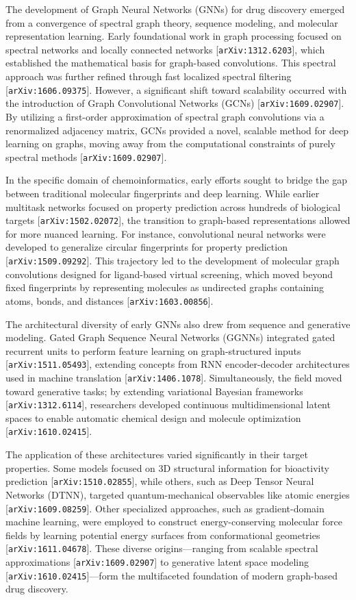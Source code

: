 \documentclass[11pt]{article}
\begin{document}
The development of Graph Neural Networks (GNNs) for drug discovery emerged from a convergence of spectral graph theory, sequence modeling, and molecular representation learning. Early foundational work in graph processing focused on spectral networks and locally connected networks [\texttt{arXiv:1312.6203}], which established the mathematical basis for graph-based convolutions. This spectral approach was further refined through fast localized spectral filtering [\texttt{arXiv:1606.09375}]. However, a significant shift toward scalability occurred with the introduction of Graph Convolutional Networks (GCNs) [\texttt{arXiv:1609.02907}]. By utilizing a first-order approximation of spectral graph convolutions via a renormalized adjacency matrix, GCNs provided a novel, scalable method for deep learning on graphs, moving away from the computational constraints of purely spectral methods [\texttt{arXiv:1609.02907}].

In the specific domain of chemoinformatics, early efforts sought to bridge the gap between traditional molecular fingerprints and deep learning. While earlier multitask networks focused on property prediction across hundreds of biological targets [\texttt{arXiv:1502.02072}], the transition to graph-based representations allowed for more nuanced learning. For instance, convolutional neural networks were developed to generalize circular fingerprints for property prediction [\texttt{arXiv:1509.09292}]. This trajectory led to the development of molecular graph convolutions designed for ligand-based virtual screening, which moved beyond fixed fingerprints by representing molecules as undirected graphs containing atoms, bonds, and distances [\texttt{arXiv:1603.00856}].

The architectural diversity of early GNNs also drew from sequence and generative modeling. Gated Graph Sequence Neural Networks (GGNNs) integrated gated recurrent units to perform feature learning on graph-structured inputs [\texttt{arXiv:1511.05493}], extending concepts from RNN encoder-decoder architectures used in machine translation [\texttt{arXiv:1406.1078}]. Simultaneously, the field moved toward generative tasks; by extending variational Bayesian frameworks [\texttt{arXiv:1312.6114}], researchers developed continuous multidimensional latent spaces to enable automatic chemical design and molecule optimization [\texttt{arXiv:1610.02415}].

The application of these architectures varied significantly in their target properties. Some models focused on 3D structural information for bioactivity prediction [\texttt{arXiv:1510.02855}], while others, such as Deep Tensor Neural Networks (DTNN), targeted quantum-mechanical observables like atomic energies [\texttt{arXiv:1609.08259}]. Other specialized approaches, such as gradient-domain machine learning, were employed to construct energy-conserving molecular force fields by learning potential energy surfaces from conformational geometries [\texttt{arXiv:1611.04678}]. These diverse origins—ranging from scalable spectral approximations [\texttt{arXiv:1609.02907}] to generative latent space modeling [\texttt{arXiv:1610.02415}]—form the multifaceted foundation of modern graph-based drug discovery.
\end{document}
